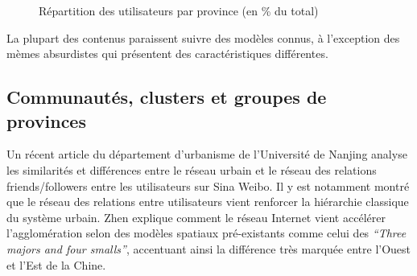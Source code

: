 \begin{figure}[h!]
    \centering
    \caption{
        Répartition des utilisateurs par province (en \% du total)
    }

\end{figure}

La plupart des contenus paraissent suivre des modèles connus, à l'exception des mèmes absurdistes qui présentent des caractéristiques différentes.

\subsection{Communautés, clusters et groupes de provinces}

Un récent article du département d{\textquoteright}urbanisme de l{\textquoteright}Université de Nanjing \citep{Zhen2013} analyse les similarités et différences entre le réseau urbain et le réseau des relations friends/followers entre les utilisateurs sur Sina Weibo. Il y est notamment montré que le réseau des relations entre utilisateurs vient renforcer la hiérarchie classique du système urbain. Zhen explique comment le réseau Internet vient accélérer l{\textquoteright}agglomération selon des modèles spatiaux pré-existants comme celui des \textit{``Three majors and four smalls''}, accentuant ainsi la différence très marquée entre l{\textquoteright}Ouest et l{\textquoteright}Est de la Chine.

